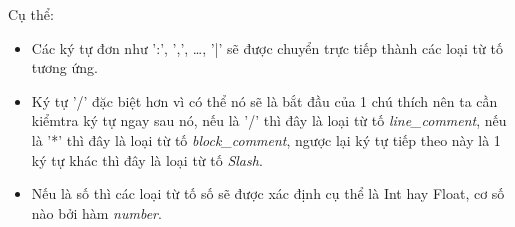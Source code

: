 Cụ thể:
\begin{itemize}
  \item Các ký tự đơn như ':', ',', \dots , '|' sẽ được chuyển trực tiếp thành các loại từ tố tương ứng.
  \item Ký tự '/' đặc biệt hơn vì có thể nó sẽ là bắt đầu của 1 chú thích nên ta cần kiểmtra ký tự ngay sau nó, nếu là '/' thì đây là loại từ tố \textit{line\_comment}, nếu là '*' thì đây là loại từ tố \textit{block\_comment}, ngược lại ký tự tiếp theo này là 1 ký tự khác thì đây là loại từ tố \textit{Slash}.
  \item Nếu là số thì các loại từ tố số sẽ được xác định cụ thể là Int hay Float, cơ số nào bởi hàm \textit{number}.




\end{itemize}
